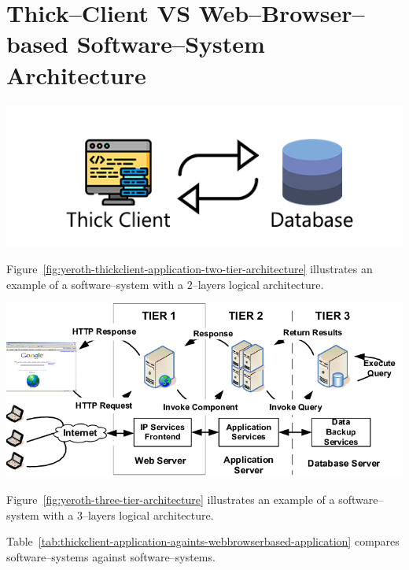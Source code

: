 \newpage


\section{Thick--Client VS Web--Browser--based
	Software--System Architecture}



\begin{center}
\includegraphics[scale=0.52]{images/yeroth-thickclient-application-two-tier-architecture.png}
\label{fig:yeroth-thickclient-application-two-tier-architecture}
\end{center}

Figure~\ref{fig:yeroth-thickclient-application-two-tier-architecture}
illustrates an example of a \thickclient
software--system with a $2$--layers
logical architecture.

\begin{center}
\includegraphics[scale=0.39]{images/yeroth-three-tier-architecture.png}
\label{fig:yeroth-three-tier-architecture}
\end{center}

Figure~\ref{fig:yeroth-three-tier-architecture}
illustrates an example of a \webbrowserbased
software--system with a $3$--layers
logical architecture.

Table~\ref{tab:thickclient-application-againts-webbrowserbased-application}
compares \thickclient software--systems against
\webbrowserbased software--systems.
